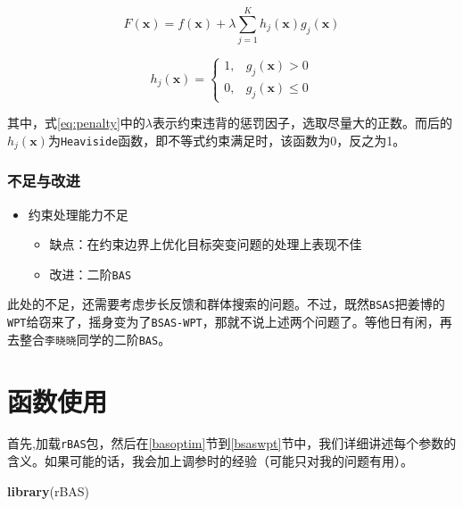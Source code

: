 \documentclass[]{ctexbook}
\newenvironment{Shaded}{\begin{snugshade}}{\end{snugshade}}
\newcommand{\KeywordTok}[1]{\textcolor[rgb]{0.13,0.29,0.53}{\textbf{#1}}}
\newcommand{\NormalTok}[1]{#1}
\providecommand{\tightlist}{%
  \setlength{\itemsep}{0pt}\setlength{\parskip}{0pt}}
\theoremstyle{definition}
\theoremstyle{definition}
\theoremstyle{definition}
\theoremstyle{remark}
\begin{document}
\begin{equation}
F(\mathbf{x})=f(\mathbf{x})+\lambda\sum_{j=1}^{K}h_j(\mathbf{x})g_j(\mathbf{x})
\label{eq:penalty}
\end{equation}

\begin{equation}
h_j(\mathbf{x}) = \begin{cases} 
1, & g_j(\mathbf{x})>0 \\ 
0, & g_j(\mathbf{x})\leq0
\end{cases}
\label{eq:violation}
\end{equation}

其中，式\eqref{eq:penalty}中的\(\lambda\)表示约束违背的惩罚因子，选取尽量大的正数。而后的\(h_j(\mathbf{x})\)为\texttt{Heaviside}函数，即不等式约束满足时，该函数为0，反之为1。

\subsection{不足与改进}\label{BSASimprove}

\begin{itemize}
\tightlist
\item
  约束处理能力不足

  \begin{itemize}
  \tightlist
  \item
    缺点：在约束边界上优化目标突变问题的处理上表现不佳
  \item
    改进：二阶\texttt{BAS}
  \end{itemize}
\end{itemize}

此处的不足，还需要考虑步长反馈和群体搜索的问题。不过，既然\texttt{BSAS}把姜博的\texttt{WPT}给窃来了，摇身变为了\texttt{BSAS-WPT}，那就不说上述两个问题了。等他日有闲，再去整合\texttt{李晓晓}同学的二阶\texttt{BAS}。

\chapter{函数使用}\label{rBAS}

首先,加载\texttt{rBAS}包，然后在\ref{basoptim}节到\ref{bsaswpt}节中，我们详细讲述每个参数的含义。如果可能的话，我会加上调参时的经验（可能只对我的问题有用）。

\begin{Shaded}
\begin{Highlighting}[]
\KeywordTok{library}\NormalTok{(rBAS)}
\end{Highlighting}
\end{Shaded}
\end{document}
